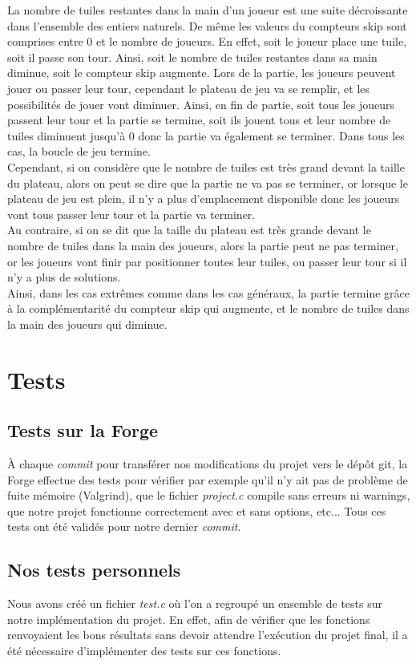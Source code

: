 \documentclass[11pt]{article}
\begin{document}
La nombre de tuiles restantes dans la main d'un joueur est une suite décroissante dans l'ensemble des entiers naturels. De même les valeurs du compteurs skip sont comprises entre 0 et le nombre de joueurs. En effet, soit le joueur place une tuile, soit il passe son tour. Ainsi, soit le nombre de tuiles restantes dans sa main diminue, soit le compteur skip augmente. Lors de la partie, les joueurs peuvent jouer ou passer leur tour, cependant le plateau de jeu va se remplir, et les possibilités de jouer vont diminuer. Ainsi, en fin de partie, soit tous les joueurs passent leur tour et la partie se termine, soit ils jouent tous et leur nombre de tuiles diminuent jusqu'à 0 donc la partie va également se terminer. Dans tous les cas, la boucle de jeu termine. \\

Cependant, si on considère que le nombre de tuiles est très grand devant la taille du plateau, alors on peut se dire que la partie ne va pas se terminer, or lorsque le plateau de jeu est plein, il n'y a plus d'emplacement disponible donc les joueurs vont tous passer leur tour et la partie va terminer.\\
Au contraire, si on se dit que la taille du plateau est très grande devant le nombre de tuiles dans la main des joueurs, alors la partie peut ne pas terminer, or les joueurs vont finir par positionner toutes leur tuiles, ou passer leur tour si il n'y a plus de solutions.\\

Ainsi, dans les cas extrêmes comme dans les cas généraux, la partie termine grâce à la complémentarité du compteur skip qui augmente, et le nombre de tuiles dans la main des joueurs qui diminue.

\section{Tests}
\subsection{Tests sur la Forge}
À chaque \emph{commit} pour transférer nos modifications du projet vers le dépôt git, la Forge effectue des tests pour vérifier par exemple qu'il n'y ait pas de problème de fuite mémoire (Valgrind), que le fichier \emph{project.c} compile sans erreurs ni warnings, que notre projet fonctionne correctement avec et sans options, etc... Tous ces tests ont été validés pour notre dernier \emph{commit}.

\subsection{Nos tests personnels}
Nous avons créé un fichier \emph{test.c} où l'on a regroupé un ensemble de tests sur notre implémentation du projet. En effet, afin de vérifier que les fonctions renvoyaient les bons résultats sans devoir attendre l'exécution du projet final, il a été nécessaire d'implémenter des tests sur ces fonctions.\\
\end{document}
